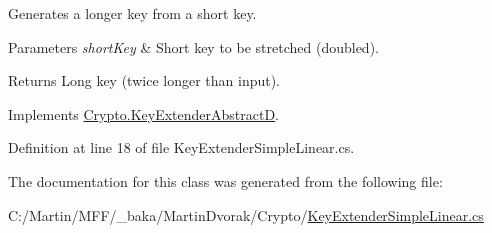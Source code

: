 Generates a longer key from a short key. 


\begin{DoxyParams}{Parameters}
{\em short\+Key} & Short key to be stretched (doubled).\\
\hline
\end{DoxyParams}
\begin{DoxyReturn}{Returns}
Long key (twice longer than input).
\end{DoxyReturn}


Implements \hyperlink{class_crypto_1_1_key_extender_abstract_d_ae403b92e9038b9c0bc7a21885e24ffc7}{Crypto.\+Key\+Extender\+Abstract\+D}.



Definition at line 18 of file Key\+Extender\+Simple\+Linear.\+cs.



The documentation for this class was generated from the following file\+:\begin{DoxyCompactItemize}
\item 
C\+:/\+Martin/\+M\+F\+F/\+\_\+baka/\+Martin\+Dvorak/\+Crypto/\hyperlink{_key_extender_simple_linear_8cs}{Key\+Extender\+Simple\+Linear.\+cs}\end{DoxyCompactItemize}
